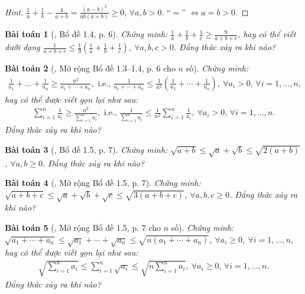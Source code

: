 \documentclass{article}
\numberwithin{equation}{section}
\newtheorem{baitoan}{Bài toán}[section]
\begin{document}
\begin{proof}[Hint]
	$\frac{1}{a} + \frac{1}{b} - \frac{4}{a + b} = \frac{(a - b)^2}{ab(a + b)}\ge 0$, $\forall a,b > 0$. ``$=$'' $\Leftrightarrow a = b > 0$.
\end{proof}

\begin{baitoan}[\cite{Son_Nghiep_Trung_Can2021}, Bổ đề 1.4, p. 6]
	Chứng minh: $\frac{1}{a} + \frac{1}{b} + \frac{1}{c}\ge\frac{9}{a + b + c}$, hay có thể viết dưới dạng $\frac{1}{a + b + c}\le\frac{1}{9}\left(\frac{1}{a} + \frac{1}{b} + \frac{1}{c}\right)$, $\forall a,b,c > 0$. Đẳng thức xảy ra khi nào?
\end{baitoan}

\begin{baitoan}[\cite{Son_Nghiep_Trung_Can2021}, Mở rộng Bổ đề 1.3--1.4, p. 6 cho $n$ số]
	Chứng minh:
	\begin{align*}
		\frac{1}{a_1} + \ldots + \frac{1}{a_n}\ge\frac{n^2}{a_1 + \cdots + a_n},\mbox{ i.e., }\frac{1}{a_1 + \cdots + a_n}\le\frac{1}{n^2}\left(\frac{1}{a_1} + \cdots + \frac{1}{a_n}\right),\ \forall a_i > 0,\,\forall i = 1,\ldots,n,
	\end{align*}
	hay có thể được viết gọn lại như sau:
	\begin{align*}
		\sum_{i=1}^{n} \frac{1}{a_i}\ge\frac{n^2}{\sum_{i=1}^n a_i},\mbox{ i.e., }\frac{1}{\sum_{i=1}^n a_i}\le\frac{1}{n^2}\sum_{i=1}^n \frac{1}{a_i},\ \forall a_i > 0,\,\forall i = 1,\ldots,n.
	\end{align*}
	Đẳng thức xảy ra khi nào?
\end{baitoan}

\begin{baitoan}[\cite{Son_Nghiep_Trung_Can2021}, Bổ đề 1.5, p. 7]
	Chứng minh: $\sqrt{a + b}\le\sqrt{a} + \sqrt{b}\le\sqrt{2(a + b)}$, $\forall a,b\ge 0$. Đẳng thức xảy ra khi nào?
\end{baitoan}

\begin{baitoan}[\cite{Son_Nghiep_Trung_Can2021}, Mở rộng Bổ đề 1.5, p. 7]
	Chứng minh: $\sqrt{a + b + c}\le\sqrt{a} + \sqrt{b} + \sqrt{c}\le\sqrt{3(a + b + c)}$, $\forall a,b,c\ge 0$. Đẳng thức xảy ra khi nào?
\end{baitoan}

\begin{baitoan}[\cite{Son_Nghiep_Trung_Can2021}, Mở rộng Bổ đề 1.5, p. 7 cho $n$ số]
	Chứng minh: $\sqrt{a_1 + \cdots + a_n}\le\sqrt{a_1} + \cdots + \sqrt{a_n}\le\sqrt{n(a_1 + \cdots + a_n)}$, $\forall a_i\ge 0$, $\forall i = 1,\ldots,n$, hay có thể được viết gọn lại như sau:
	\begin{align*}
		\sqrt{\sum_{i=1}^n a_i}\le\sum_{i=1}^n \sqrt{a_i}\le\sqrt{n\sum_{i=1}^n a_i},\ \forall a_i\ge 0,\,\forall i = 1,\ldots,n.
	\end{align*}
	Đẳng thức xảy ra khi nào?
\end{baitoan}
\end{document}
